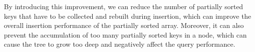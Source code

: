 \documentclass[11pt,a4paper]{article}
\begin{document}
By introducing this improvement, we can reduce the number of partially sorted keys that have to be collected and rebuilt during insertion, which can improve the overall insertion performance of the partially sorted array. Moreover, it can also prevent the accumulation of too many partially sorted keys in a node, which can cause the tree to grow too deep and negatively affect the query performance.


\end{document}
